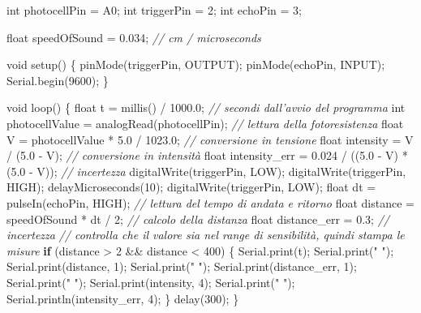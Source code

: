 \documentclass[11pt]{article}
\newenvironment{Shaded}{}{}
\newcommand{\DataTypeTok}[1]{\textcolor[rgb]{0.56,0.13,0.00}{{#1}}}
\newcommand{\DecValTok}[1]{\textcolor[rgb]{0.25,0.63,0.44}{{#1}}}
\newcommand{\FloatTok}[1]{\textcolor[rgb]{0.25,0.63,0.44}{{#1}}}
\newcommand{\StringTok}[1]{\textcolor[rgb]{0.25,0.44,0.63}{{#1}}}
\newcommand{\CommentTok}[1]{\textcolor[rgb]{0.38,0.63,0.69}{\textit{{#1}}}}
\newcommand{\NormalTok}[1]{{#1}}
\newcommand{\ControlFlowTok}[1]{\textcolor[rgb]{0.00,0.44,0.13}{\textbf{{#1}}}}
\begin{document}
\begin{Shaded}
\begin{Highlighting}[]
\DataTypeTok{int}\NormalTok{ photocellPin = A0;}
\DataTypeTok{int}\NormalTok{ triggerPin = }\DecValTok{2}\NormalTok{;}
\DataTypeTok{int}\NormalTok{ echoPin = }\DecValTok{3}\NormalTok{;}

\DataTypeTok{float}\NormalTok{ speedOfSound = }\FloatTok{0.034}\NormalTok{; }\CommentTok{// cm / microseconds}

\DataTypeTok{void}\NormalTok{ setup() \{}
\NormalTok{  pinMode(triggerPin, OUTPUT);}
\NormalTok{  pinMode(echoPin, INPUT);}
\NormalTok{  Serial.begin(}\DecValTok{9600}\NormalTok{);}
\NormalTok{\}}

\DataTypeTok{void}\NormalTok{ loop() \{}
  \DataTypeTok{float}\NormalTok{ t = millis() / }\FloatTok{1000.0}\NormalTok{; }\CommentTok{// secondi dall'avvio del programma}
  \DataTypeTok{int}\NormalTok{ photocellValue = analogRead(photocellPin); }\CommentTok{// lettura della fotoresistenza}
  \DataTypeTok{float}\NormalTok{ V = photocellValue * }\FloatTok{5.0}\NormalTok{ / }\FloatTok{1023.0}\NormalTok{; }\CommentTok{// conversione in tensione}
  \DataTypeTok{float}\NormalTok{ intensity = V / (}\FloatTok{5.0}\NormalTok{ - V); }\CommentTok{// conversione in intensità}
  \DataTypeTok{float}\NormalTok{ intensity_err = }\FloatTok{0.024}\NormalTok{ / ((}\FloatTok{5.0}\NormalTok{ - V) * (}\FloatTok{5.0}\NormalTok{ - V)); \CommentTok{// incertezza}}
\NormalTok{  digitalWrite(triggerPin, LOW);}
\NormalTok{  digitalWrite(triggerPin, HIGH);}
\NormalTok{  delayMicroseconds(}\DecValTok{10}\NormalTok{);}
\NormalTok{  digitalWrite(triggerPin, LOW);}
  \DataTypeTok{float}\NormalTok{ dt = pulseIn(echoPin, HIGH); }\CommentTok{// lettura del tempo di andata e ritorno}
  \DataTypeTok{float}\NormalTok{ distance = speedOfSound * dt / }\DecValTok{2}\NormalTok{; }\CommentTok{// calcolo della distanza}
  \DataTypeTok{float}\NormalTok{ distance_err = }\FloatTok{0.3}\NormalTok{; }\CommentTok{// incertezza}
  \CommentTok{// controlla che il valore sia nel range di sensibilità, quindi stampa le misure }
  \ControlFlowTok{if}\NormalTok{ (distance > }\DecValTok{2}\NormalTok{ && distance < }\DecValTok{400}\NormalTok{) \{ }
\NormalTok{    Serial.print(t);}
\NormalTok{    Serial.print(}\StringTok{" "}\NormalTok{);}
\NormalTok{    Serial.print(distance, }\DecValTok{1}\NormalTok{);}
\NormalTok{    Serial.print(}\StringTok{" "}\NormalTok{);}
\NormalTok{    Serial.print(distance_err, }\DecValTok{1}\NormalTok{);}
\NormalTok{    Serial.print(}\StringTok{" "}\NormalTok{);}
\NormalTok{    Serial.print(intensity, }\DecValTok{4}\NormalTok{);}
\NormalTok{    Serial.print(}\StringTok{" "}\NormalTok{);}
\NormalTok{    Serial.println(intensity_err, }\DecValTok{4}\NormalTok{);}
\NormalTok{  \}}
\NormalTok{  delay(}\DecValTok{300}\NormalTok{);}
\NormalTok{\}}
\end{Highlighting}
\end{Shaded}
\end{document}
